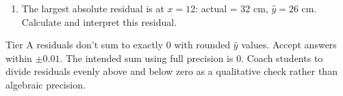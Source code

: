 \documentclass[10pt]{article}
\begin{document}
\begin{tcolorbox}[colback=white, colframe=black!40, boxrule=0.8pt, arc=2mm,
    left=4mm, right=4mm, top=3mm, bottom=3mm,
    title={\textbf{Tier E --- Extension}}, fonttitle=\bfseries, halign title=center]
\begin{enumerate}[leftmargin=1.6em, itemsep=0.18in]
  \item The largest absolute residual is at $x = 12$: actual = 32 cm, $\hat{y} = 26$ cm.
        Calculate and interpret this residual.\\[8pt]

\end{enumerate}
\end{tcolorbox}

\begin{teachernote}
Tier A residuals don't sum to exactly 0 with rounded $\hat{y}$ values. Accept answers within
$\pm 0.01$. The intended sum using full precision is 0. Coach students to divide residuals
evenly above and below zero as a qualitative check rather than algebraic precision.
\end{teachernote}
\end{document}
